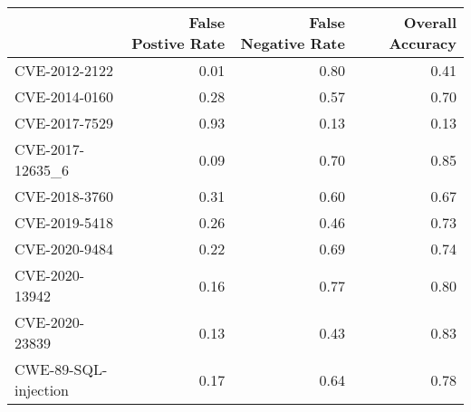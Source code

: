 \begin{tabular}{lrrr}
\toprule
{} &  False Postive Rate &  False Negative Rate &  Overall Accuracy \\
\midrule
CVE-2012-2122        &                0.01 &                 0.80 &              0.41 \\
CVE-2014-0160        &                0.28 &                 0.57 &              0.70 \\
CVE-2017-7529        &                0.93 &                 0.13 &              0.13 \\
CVE-2017-12635\_6     &                0.09 &                 0.70 &              0.85 \\
CVE-2018-3760        &                0.31 &                 0.60 &              0.67 \\
CVE-2019-5418        &                0.26 &                 0.46 &              0.73 \\
CVE-2020-9484        &                0.22 &                 0.69 &              0.74 \\
CVE-2020-13942       &                0.16 &                 0.77 &              0.80 \\
CVE-2020-23839       &                0.13 &                 0.43 &              0.83 \\
CWE-89-SQL-injection &                0.17 &                 0.64 &              0.78 \\
\bottomrule
\end{tabular}
